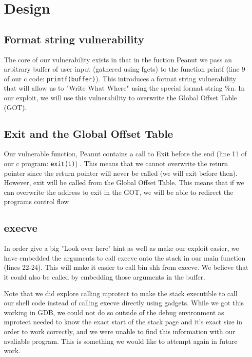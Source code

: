 \section{Design}
\subsection{Format string vulnerability}
The core of our vulnerability exists in that in the fuction Peanut we pass an arbitrary buffer of user input (gathered using fgets) to the function printf (line 9 of our c code: {\tt printf(buffer)}). This introduces a format string vulnerability that will allow us to "Write What Where" using the special format string \%n. In our exploit, we will use this vulnerability to overwrite the Global Offset Table (GOT).
\subsection{Exit and the Global Offset Table}
Our vulnerable function, Peanut contains a call to Exit before the end (line 11 of our c program: {\tt exit(1)}) . This means that we cannot overwrite the return pointer since the return pointer will never be called (we will exit before then). However, exit will be called from the Global Offset Table. This means that if we can overwrite the address to exit in the GOT, we will be able to redirect the programs control flow
\subsection{execve}
In order give a big "Look over here" hint as well as make our exploit easier, we have embedded the arguments to call execve onto the stack in our main function (lines 22-24). This will make it easier to call bin shh from execve. We believe that it could also be called by embedding those arguments in the buffer. 

Note that we did explore calling mprotect to make the stack executible to call our shell code instead of calling execve directly using gadgets. While we got this working in GDB, we could not do so outside of the debug environment as mprotect needed to know the exact start of the stack page and it's exact size in order to work correctly, and we were unable to find this information with our avaliable program. This is something we would like to attempt again in future work.